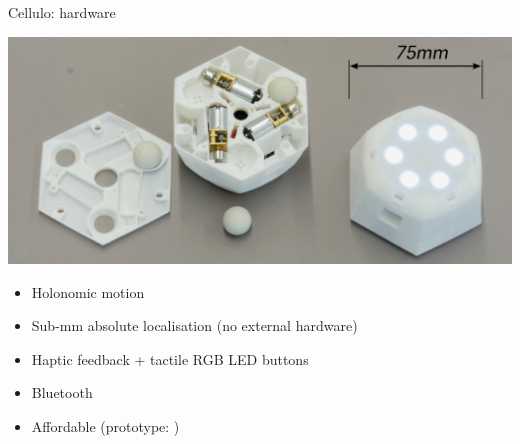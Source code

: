 \documentclass[compress]{beamer}
\begin{document}
 \begin{frame}{Cellulo: hardware}
     \begin{center}
         \includegraphics[width=0.8\linewidth]{cellulo/hardware-design}
     \end{center}
     \begin{itemize}
         \item Holonomic motion
         \item Sub-mm absolute localisation (no external hardware)
         \item Haptic feedback + tactile RGB LED buttons 
         \item Bluetooth
         \item<2> Affordable (prototype: )
     \end{itemize}
 \end{frame}









%
%
\end{document}
